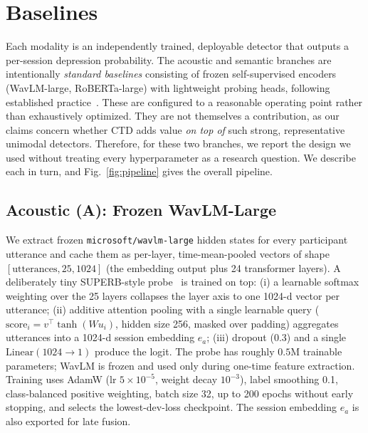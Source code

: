 \documentclass{article}
\begin{document}
\section{Baselines}
\label{sec:modalities}
Each modality is an independently trained, deployable detector that outputs a per-session depression probability. 
The acoustic and semantic branches are intentionally \emph{standard baselines} consisting of frozen self-supervised encoders (WavLM-large, RoBERTa-large) with lightweight probing heads, following established practice~\cite{yang2021superb}. 
These are configured to a reasonable operating point rather than exhaustively optimized. 
They are not themselves a contribution, as our claims concern whether CTD adds value \emph{on top of} such strong, representative unimodal detectors. 
Therefore, for these two branches, we report the design we used without treating every hyperparameter as a research question. We describe each in turn, and Fig.~\ref{fig:pipeline} gives the overall pipeline.

\subsection{Acoustic (A): Frozen WavLM-Large}
We extract frozen \texttt{microsoft/wavlm-large} hidden states for every participant utterance and cache them as per-layer, time-mean-pooled vectors of shape $[\text{utterances}, 25, 1024]$ (the embedding output plus 24 transformer layers). 
A deliberately tiny SUPERB-style probe~\cite{yang2021superb} is trained on top: (i) a learnable softmax weighting over the 25 layers collapses the layer axis to one 1024-d vector per utterance; (ii) additive attention pooling with a single learnable query ($\text{score}_i = v^\top \tanh(W u_i)$, hidden size 256, masked over padding) aggregates utterances into a 1024-d session embedding $e_a$; (iii) dropout (0.3) and a single $\text{Linear}(1024 \to 1)$ produce the logit. The probe has roughly $0.5$M trainable parameters; WavLM is frozen and used only during one-time feature extraction. Training uses AdamW (lr $5\times10^{-5}$, weight decay $10^{-3}$), label smoothing 0.1, class-balanced positive weighting, batch size 32, up to 200 epochs without early stopping, and selects the lowest-dev-loss checkpoint. The session embedding $e_a$ is also exported for late fusion.
\end{document}
